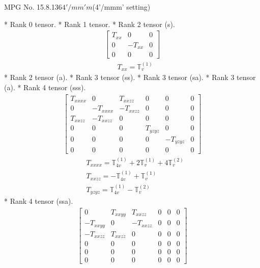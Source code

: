 \documentclass[fleqn,8pt,landscape]{jsarticle}
\begin{document}
\setcounter{MaxMatrixCols}{32}

\renewcommand{\tablename}{Table~}
\renewcommand{\figurename}{Figure~}
\begin{center}
\LARGE
MPG No. 15.8.136\quad$4'/mm'm$\quad(4'/mmm' setting)
\end{center}
* Rank 0 tensor.
* Rank 1 tensor.
* Rank 2 tensor (s).
\begin{align*}
\begin{bmatrix} T_{xx} & 0 & 0 \\ 0 & - T_{xx} & 0 \\ 0 & 0 & 0 \end{bmatrix}
\end{align*}
\begin{align*}
& T_{xx} = \mathbb{T}_{v}^{(1)}
\end{align*}
* Rank 2 tensor (a).
* Rank 3 tensor (ss).
* Rank 3 tensor (sa).
* Rank 3 tensor (a).
* Rank 4 tensor (sss).
\begin{align*}
\begin{bmatrix} T_{xxxx} & 0 & T_{xxzz} & 0 & 0 & 0 \\ 0 & - T_{xxxx} & - T_{xxzz} & 0 & 0 & 0 \\ T_{xxzz} & - T_{xxzz} & 0 & 0 & 0 & 0 \\ 0 & 0 & 0 & T_{yzyz} & 0 & 0 \\ 0 & 0 & 0 & 0 & - T_{yzyz} & 0 \\ 0 & 0 & 0 & 0 & 0 & 0 \end{bmatrix}
\end{align*}
\begin{align*}
& T_{xxxx} = \mathbb{T}_{4v}^{(1)} + 2 \mathbb{T}_{v}^{(1)} + 4 \mathbb{T}_{v}^{(2)} \\
& T_{xxzz} = - \mathbb{T}_{4v}^{(1)} + \mathbb{T}_{v}^{(1)} \\
& T_{yzyz} = \mathbb{T}_{4v}^{(1)} - \mathbb{T}_{v}^{(2)}
\end{align*}
* Rank 4 tensor (ssa).
\begin{align*}
\begin{bmatrix} 0 & T_{xxyy} & T_{xxzz} & 0 & 0 & 0 \\ - T_{xxyy} & 0 & - T_{xxzz} & 0 & 0 & 0 \\ - T_{xxzz} & T_{xxzz} & 0 & 0 & 0 & 0 \\ 0 & 0 & 0 & 0 & 0 & 0 \\ 0 & 0 & 0 & 0 & 0 & 0 \\ 0 & 0 & 0 & 0 & 0 & 0 \end{bmatrix}
\end{align*}
\end{document}

